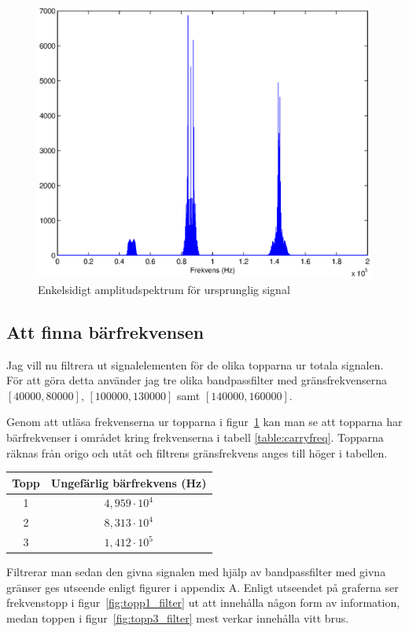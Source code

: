 \documentclass[10pt,twocolumn]{article}
\begin{document}
\begin{figure}[htp]
  \begin{center}
  \includegraphics[keepaspectratio=true,width=\linewidth]{fft_orig_data_oneside.eps}  %
  \end{center}
  \caption{Enkelsidigt amplitudspektrum för ursprunglig signal} %
  \label{fig:fft_orig_data}
\end{figure}

\subsection{Att finna bärfrekvensen}

Jag vill nu filtrera ut signalelementen för de olika topparna ur totala signalen. För att göra detta använder jag tre olika bandpassfilter med gränsfrekvenserna $[40000, 80000]$, $[100000, 130000]$ samt $[140000, 160000]$.

Genom att utläsa frekvenserna ur topparna i figur~\ref{fig:fft_orig_data} kan man se att topparna har bärfrekvenser i området kring frekvenserna i tabell \ref{table:carryfreq}. Topparna räknas från origo och utåt och filtrens gränsfrekvens anges till höger i tabellen. 
\begin{center}
\begin{tabular}{c | c }
	\hline
	Topp & Ungefärlig bärfrekvens (Hz) \\ \hline
	1 & $4,959 \cdot 10^4$ \\ \hline
	2 & $8,313 \cdot 10^4$ \\ \hline
	3 & $1,412 \cdot 10^5$ \\ \hline
\end{tabular}
 \label{table:carryfreq}
\end{center}
Filtrerar man sedan den givna signalen med hjälp av bandpassfilter med givna gränser ges utseende enligt figurer i appendix A. Enligt utseendet på graferna ser frekvenstopp i figur~\ref{fig:topp1_filter} ut att innehålla någon form av information, medan toppen i figur~\ref{fig:topp3_filter} mest verkar innehålla vitt brus. 
\end{document}
